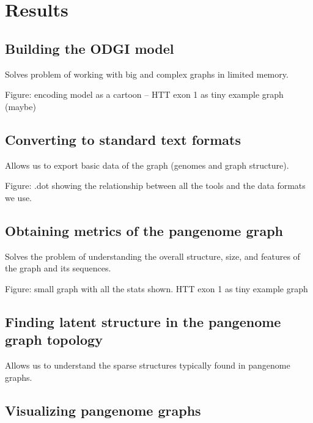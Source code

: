 \documentclass{bioinfo}
\begin{document}
\section{Results}

\subsection{Building the \textsc{ODGI} model}


Solves problem of working with big and complex graphs in limited memory.

Figure: encoding model as a cartoon --  HTT exon 1 as tiny example graph (maybe)

\subsection{Converting to standard text formats}


Allows us to export basic data of the graph (genomes and graph structure).

Figure: .dot showing the relationship between all the tools and the data formats we use.

\subsection{Obtaining metrics of the pangenome graph}


Solves the problem of understanding the overall structure, size, and features of the graph and its sequences.

Figure: small graph with all the stats shown. HTT exon 1 as tiny example graph

\subsection{Finding latent structure in the pangenome graph topology}


Allows us to understand the sparse structures typically found in pangenome graphs.

\subsection{Visualizing pangenome graphs}
\end{document}
